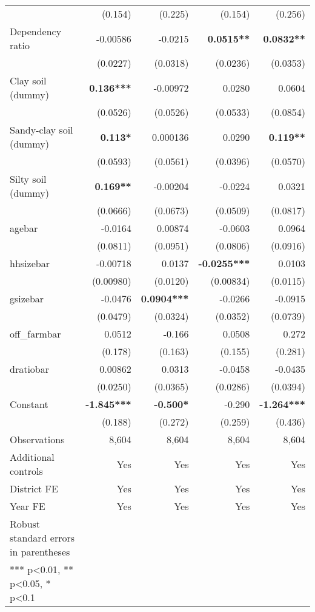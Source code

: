 \documentclass[
]{article}
\begin{document}
\begin{longtable}[t]{lrrrr}
 & (0.154) & (0.225) & (0.154) & (0.256)\\
Dependency ratio & -0.00586 & -0.0215 & \textbf{0.0515**} & \textbf{0.0832**}\\
 & (0.0227) & (0.0318) & (0.0236) & (0.0353)\\
Clay soil (dummy) & \textbf{0.136***} & -0.00972 & 0.0280 & 0.0604\\
 & (0.0526) & (0.0526) & (0.0533) & (0.0854)\\
Sandy-clay soil (dummy) & \textbf{0.113*} & 0.000136 & 0.0290 & \textbf{0.119**}\\
 & (0.0593) & (0.0561) & (0.0396) & (0.0570)\\
Silty soil (dummy) & \textbf{0.169**} & -0.00204 & -0.0224 & 0.0321\\
 & (0.0666) & (0.0673) & (0.0509) & (0.0817)\\
agebar & -0.0164 & 0.00874 & -0.0603 & 0.0964\\
 & (0.0811) & (0.0951) & (0.0806) & (0.0916)\\
hhsizebar & -0.00718 & 0.0137 & \textbf{-0.0255***} & 0.0103\\
 & (0.00980) & (0.0120) & (0.00834) & (0.0115)\\
gsizebar & -0.0476 & \textbf{0.0904***} & -0.0266 & -0.0915\\
 & (0.0479) & (0.0324) & (0.0352) & (0.0739)\\
off\_farmbar & 0.0512 & -0.166 & 0.0508 & 0.272\\
 & (0.178) & (0.163) & (0.155) & (0.281)\\
dratiobar & 0.00862 & 0.0313 & -0.0458 & -0.0435\\
 & (0.0250) & (0.0365) & (0.0286) & (0.0394)\\
Constant & \textbf{-1.845***} & \textbf{-0.500*} & -0.290 & \textbf{-1.264***}\\
\midrule
 & (0.188) & (0.272) & (0.259) & (0.436)\\
Observations & 8,604 & 8,604 & 8,604 & 8,604\\
Additional controls & Yes & Yes & Yes & Yes\\
District FE & Yes & Yes & Yes & Yes\\
Year FE & Yes & Yes & Yes & Yes\\
\midrule
Robust standard errors in parentheses &  &  &  & \\
*** p<0.01, ** p<0.05, * p<0.1 &  &  &  & \\*
\end{longtable}
\endgroup{}
\end{document}
